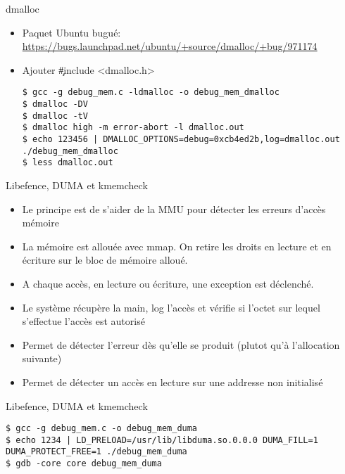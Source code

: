 \begin{frame}[fragile=singleslide]{dmalloc}
  \begin{itemize}
  \item Paquet Ubuntu bugué: \url{https://bugs.launchpad.net/ubuntu/+source/dmalloc/+bug/971174}
  \item Ajouter \c{#include <dmalloc.h>}
  \begin{lstlisting}
$ gcc -g debug_mem.c -ldmalloc -o debug_mem_dmalloc
$ dmalloc -DV
$ dmalloc -tV
$ dmalloc high -m error-abort -l dmalloc.out
$ echo 123456 | DMALLOC_OPTIONS=debug=0xcb4ed2b,log=dmalloc.out ./debug_mem_dmalloc
$ less dmalloc.out
  \end{lstlisting}
  \end{itemize}
\end{frame}

\begin{frame}[fragile=singleslide]{Libefence, DUMA et kmemcheck}
  \begin{itemize}
  \item Le principe est de s'aider de la MMU pour détecter les erreurs
    d'accès mémoire
  \item  La mémoire est  allouée avec  mmap. On  retire les  droits en
    lecture et en écriture sur le bloc de mémoire alloué.
  \item  A chaque  accès, en  lecture ou  écriture, une  exception est
    déclenché.
  \item Le système récupère la main, log l'accès et vérifie si l'octet
    sur lequel s'effectue l'accès est autorisé
  \item  Permet de détecter  l'erreur dès  qu'elle se  produit (plutot
    qu'à l'allocation suivante)
  \item Permet  de détecter un accès  en lecture sur  une addresse non
    initialisé
  \end{itemize}
\end{frame}

\begin{frame}[fragile=singleslide]{Libefence, DUMA et kmemcheck}
  \begin{lstlisting}
$ gcc -g debug_mem.c -o debug_mem_duma
$ echo 1234 | LD_PRELOAD=/usr/lib/libduma.so.0.0.0 DUMA_FILL=1 DUMA_PROTECT_FREE=1 ./debug_mem_duma
$ gdb -core core debug_mem_duma
  \end{lstlisting}
\end{frame}

